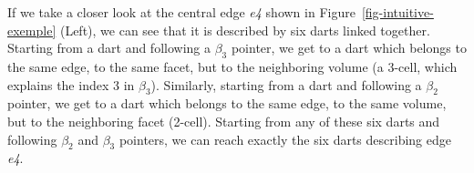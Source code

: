 If we take a closer look at the central edge \emph{e4} shown in
Figure~\ref{fig-intuitive-exemple} (Left), we can see that it is
described by six darts linked together.  Starting from a dart and
following a $\beta_3$ pointer, we get to a dart which belongs to the
same edge, to the same facet, but to the neighboring volume (a 3-cell,
which explains the index 3 in $\beta_3$).  Similarly, starting from
a dart and following a $\beta_2$ pointer, we get to a dart which
belongs to the same edge, to the same volume, but to the neighboring
facet (2-cell). Starting from any of these six darts and following
$\beta_2$ and $\beta_3$ pointers, we can reach exactly the six darts
describing edge \emph{e4}.
%
%
\def\LargFig{.3\textwidth}
